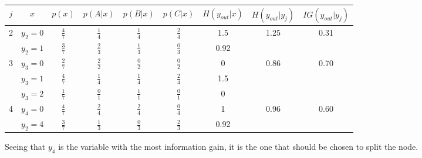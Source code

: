 \documentclass{article}
\begin{document}
\begin{enumerate}[leftmargin=\labelsep]
\begin{table}[H]
  \begin{tabular}{cc|ccccc|cc}
  $j$ & $x$                    & $p(x)$        & $p(A | x)$   & $p(B | x)$   & $p(C | x)$   & $H(y_{out}|x)$ & $H(y_{out}|y_j)$ & $IG(y_{out}|y_j)$ \\ \midrule
  \multirow{2}{*}{2} & $y_2=0$ & $\frac{4}{7}$ & $\frac{1}{4}$ & $\frac{1}{4}$ & $\frac{2}{4}$ & 1.5  & \multirow{2}{*}{1.25} & \multirow{2}{*}{0.31} \\
   &                   $y_2=1$ & $\frac{3}{7}$ & $\frac{2}{3}$ & $\frac{1}{3}$ & $\frac{0}{3}$ & 0.92 &  &  \\ \midrule
  \multirow{3}{*}{3} & $y_3=0$ & $\frac{2}{7}$ & $\frac{2}{2}$ & $\frac{0}{2}$ & $\frac{0}{2}$ & 0    & \multirow{3}{*}{0.86} & \multirow{3}{*}{0.70} \\
   &                   $y_3=1$ & $\frac{4}{7}$ & $\frac{1}{4}$ & $\frac{1}{4}$ & $\frac{2}{4}$ & 1.5  &  &  \\
   &                   $y_3=2$ & $\frac{1}{7}$ & $\frac{0}{1}$ & $\frac{1}{1}$ & $\frac{0}{1}$ & 0    &  &  \\ \midrule
  \multirow{2}{*}{4} & $y_4=0$ & $\frac{4}{7}$ & $\frac{2}{4}$ & $\frac{2}{4}$ & $\frac{0}{4}$ & 1    & \multirow{2}{*}{0.96} & \multirow{2}{*}{0.60} \\
   &                   $y_2=4$ & $\frac{3}{7}$ & $\frac{1}{3}$ & $\frac{0}{3}$ & $\frac{2}{3}$ & 0.92 &  &  \\ \bottomrule
  \end{tabular}
\end{table}

Seeing that $y_4$ is the variable with the most information 
gain, it is the one that should be chosen to split the node.



\end{enumerate}
\end{document}

